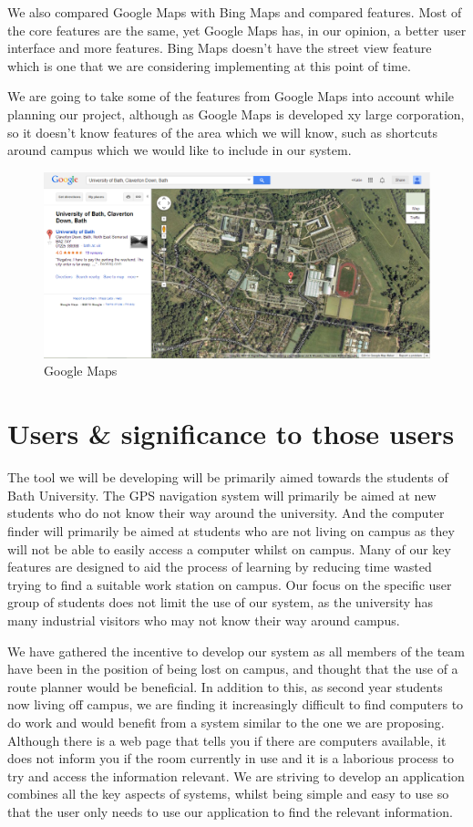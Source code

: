 \documentclass[10pt,a4paper,oneside]{report}
\begin{document}
We also compared Google Maps with Bing Maps and compared features. Most of the core features are the same, yet Google Maps has, in our opinion, a better user interface and more features. Bing Maps doesn't have the street view feature which is one that we are considering implementing at this point of time.

We are going to take some of the features from Google Maps into account while planning our project, although as Google Maps is developed xy large corporation, so it doesn't know features of the area which we will know, such as shortcuts around campus which we would like to include in our system.


\begin{figure}[H]
 \centering
 \includegraphics[keepaspectratio, width=\textwidth]{googlemapsexample.png}
 \caption{Google Maps}
\end{figure}

\section*{Users \& significance to those users}
The tool we will be developing will be primarily aimed towards the students of Bath University.  The GPS navigation system will primarily be aimed at new students who do not know their way around the university. And the computer finder will primarily be aimed at students who are not living on campus as they will not be able to easily access a computer whilst on campus. Many of our key features are designed to aid the process of learning by reducing time wasted trying to find a suitable work station on campus. Our focus on the specific user group of students does not limit the use of our system, as the university has many industrial visitors who may not know their way around campus.

We have gathered the incentive to develop our system as all members of the team have been in the position of being lost on campus, and thought that the use of a route planner would be beneficial. In addition to this, as second year students now living off campus, we are finding it increasingly difficult to find computers to do work and would benefit from a system similar to the one we are proposing.  Although there is a web page that tells you if there are computers available, it does not inform you if the room currently in use and it is a laborious process to try and access the information relevant. We are striving to develop an application combines all the key aspects of systems, whilst being simple and easy to use so that the user only needs to use our application to find the relevant information.
\end{document}
